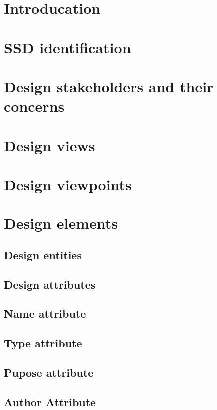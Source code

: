 \documentclass{scrreprt}
\begin{document}
\section{Introducation}

\section{SSD identification}

\section{Design stakeholders and their concerns}

\section{Design views}

\section{Design viewpoints}

\section{Design elements}

\subsection{Design entities}

\subsection{Design attributes}

\subsection{Name attribute}

\subsection{Type attribute}

\subsection{Pupose attribute}

\subsection{Author Attribute}
\end{document}
